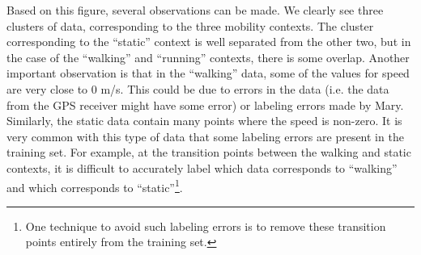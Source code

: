 Based on this figure, several observations can be made. We clearly see three clusters of data, corresponding to the three mobility contexts. The cluster corresponding to the ``static'' context is well separated from the other two, but in the case of the ``walking'' and ``running'' contexts, there is some overlap. Another important observation is that in the ``walking'' data, some of the values for speed are very close to 0 m/s. This could be due to errors in the data (i.e. the data from the GPS receiver might have some error) or labeling errors made by Mary. Similarly, the static data contain many points where the speed is non-zero. It is very common with this type of data that some labeling errors are present in the training set. For example, at the transition points between the walking and static contexts, it is difficult to accurately label which data corresponds to ``walking'' and which corresponds to ``static''\footnote{One technique to avoid such labeling errors is to remove these transition points entirely from the training set.}.
